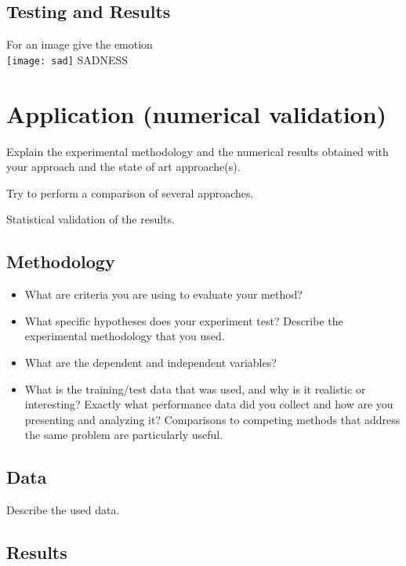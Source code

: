 \documentclass[runningheads,a4paper,11pt]{report}
\begin{document}
{
\section{Testing and Results}
}
For an image give the emotion \\
\texttt{[image: sad]}
SADNESS\\



\chapter{Application (numerical validation)}
\label{chapter:application}


Explain the experimental methodology and the numerical results obtained with your approach and the state of art approache(s).

Try to perform a comparison of several approaches.

Statistical validation of the results.


\section{Methodology}
\label{section:methodology}

\begin{itemize}
	\item What are criteria you are using to evaluate your method? 
	\item What specific hypotheses does your experiment test? Describe the experimental methodology that you used. 
	\item What are the dependent and independent variables? 
	\item What is the training/test data that was used, and why is it realistic or interesting? Exactly what performance data did you collect and how are you presenting and analyzing it? Comparisons to competing methods that address the same problem are particularly useful.
\end{itemize}

\section{Data}
\label{section:data}

Describe the used data.

\section{Results}
\label{section:results}
\end{document}

